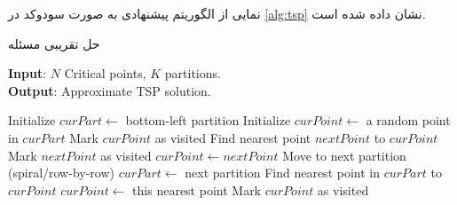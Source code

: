 نمایی از الگوریتم پیشنهادی به صورت سودوکد در 
\autoref{alg:tsp}
نشان  داده شده است. 
\begin{algorithm}[t]
	\caption{حل تقریبی مسئله }
	\label{alg:tsp}
	\begin{latin}
		\raggedright
		\textbf{Input}: $N$ Critical points, $K$ partitions.\\
		\vspace{2mm}\textbf{Output}: Approximate TSP solution.
		\begin{algorithmic}[1]
			\STATE\vspace{2mm} Initialize $curPart \gets$ bottom-left partition
			\STATE\vspace{2mm} Initialize $curPoint \gets$ a random point in $curPart$
			\STATE\vspace{2mm} Mark $curPoint$ as visited
			\vspace{2mm}\REPEAT
			\vspace{2mm}
			\STATE\vspace{2mm} Find nearest point $nextPoint$ to $curPoint$
			\STATE\vspace{2mm} Mark $nextPoint$ as visited
			\STATE\vspace{2mm} $curPoint \gets nextPoint$
			\vspace{2mm}\ENDWHILE
			\vspace{2mm}
			\STATE\vspace{2mm} Move to next partition (spiral/row-by-row)
			\STATE\vspace{2mm} $curPart \gets$ next partition
			\STATE\vspace{2mm} Find nearest point in $curPart$ to $curPoint$
			\STATE\vspace{2mm} $curPoint \gets$ this nearest point
			\STATE\vspace{2mm} Mark $curPoint$ as visited
			\vspace{2mm}\ENDIF
			\vspace{2mm}\vspace{2mm}
		\end{algorithmic}
	\end{latin}
\end{algorithm}

